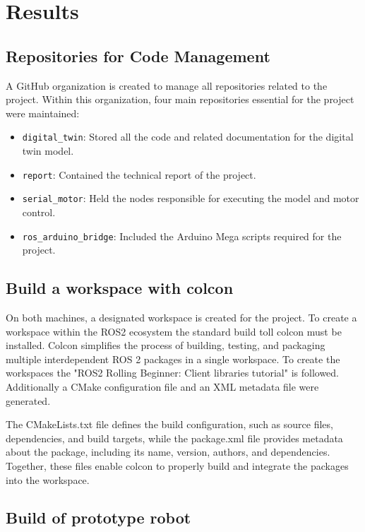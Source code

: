 \chapter{Results}


\section{Repositories for Code Management}

A GitHub organization is created to manage all repositories related to the project. Within this organization, four main repositories essential for the project were maintained:
\begin{itemize}
    \item \verb|digital_twin|: Stored all the code and related documentation for the digital twin model.
    \item \verb|report|: Contained the technical report of the project.
    \item \verb|serial_motor|: Held the nodes responsible for executing the model and motor control.
    \item \verb|ros_arduino_bridge|: Included the Arduino Mega scripts required for the project.
\end{itemize}

\section{Build a workspace with colcon}

On both machines, a designated workspace is created for the project. To create a workspace within the ROS2 ecosystem the standard build toll colcon must be installed. Colcon simplifies the process of building, testing, and packaging multiple interdependent ROS 2 packages in a single workspace. To create the workspaces the "ROS2 Rolling Beginner: Client libraries tutorial" is followed.\autocite{openroboticsUsingColconBuild} Additionally a CMake configuration file and an XML metadata file were generated. 

The CMakeLists.txt file defines the build configuration, such as source files, dependencies, and build targets, while the package.xml file provides metadata about the package, including its name, version, authors, and dependencies. Together, these files enable colcon to properly build and integrate the packages into the workspace. \autocite{dirkUniversalBuildTool}

\section{Build of prototype robot}

